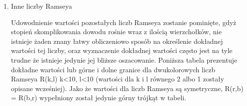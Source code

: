 \begin{enumerate}
\item Inne liczby Ramseya \hfill \par

 Udowodnienie wartości pozostałych liczb Ramseya zostanie pominięte, gdyż stopień skomplikowania dowodu rośnie wraz z ilością wierzchołków, nie istnieje żaden znany łatwy obliczeniowo sposób na określenie dokładnej wartości tej liczby, oraz wyznaczenie dokładnej wartości często jest na tyle trudne że istnieje jedynie jej bliższe oszacowanie. Poniższa tabela prezentuje dokładne wartości lub górne i dolne granice dla dwukolorowych liczb Ramseya R(k,l) k<10, l<10 (wartości dla k i l równego 2 albo 1 zostały opisane wcześniej). Jako że wartości dla liczb Ramseya są symetryczne, R(r,b) = R(b,r) wypełniony został jedynie górny trójkąt w tabeli.
 
\begin{figure}[h]
  \centering
{}
\end{figure}
\end{enumerate}

